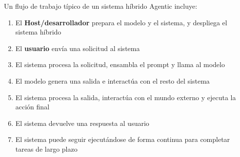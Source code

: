 Un flujo de trabajo típico de un sistema híbrido Agentic incluye:
\begin{enumerate}
    \item El \textbf{Host/desarrollador} prepara el modelo y el sistema, y despliega el sistema híbrido
    \item El \textbf{usuario} envía una solicitud al sistema
    \item El sistema procesa la solicitud, ensambla el prompt y llama al modelo
    \item El modelo genera una salida e interactúa con el resto del sistema
    \item El sistema procesa la salida, interactúa con el mundo externo y ejecuta la acción final
    \item El sistema devuelve una respuesta al usuario
    \item El sistema puede seguir ejecutándose de forma continua para completar tareas de largo plazo
\end{enumerate}

